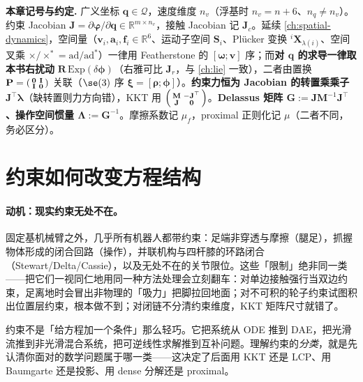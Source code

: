\begin{note}
\textbf{本章记号与约定.}\;
广义坐标 $\mathbf q\in\mathcal Q$，速度维度 $n_v$（浮基时 $n_v=n+6$、$n_q\neq n_v$）。约束 Jacobian $\mathbf J=\partial\boldsymbol\varphi/\partial\mathbf q\in\mathbb R^{m\times n_v}$，接触 Jacobian 记 $\mathbf J_c$。延续 \cref{ch:spatial-dynamics}，空间量（$\mathbf v_i,\mathbf a_i,\mathbf f_i\in\mathbb R^6$、运动子空间 $\mathbf S_i$、Plücker 变换 ${}^i\mathbf X_{\lambda(i)}$、空间叉乘 $\times/\times^*=\mathrm{ad}/\mathrm{ad}^*$）一律用 Featherstone 的 $[\boldsymbol\omega;\mathbf v]$ 序；而\textbf{对 $\mathbf q$ 的求导一律取本书右扰动} $\mathbf R\,\mathrm{Exp}(\delta\boldsymbol\phi)$（右雅可比 $\mathbf J_r$，与 \cref{ch:lie} 一致），二者由置换 $\mathbf P=\begin{psmallmatrix}\mathbf 0&\mathbf I\\\mathbf I&\mathbf 0\end{psmallmatrix}$ 关联（$\se(3)$ 序 $\boldsymbol\xi=[\boldsymbol\rho;\boldsymbol\phi]$）。\textbf{约束力恒为 Jacobian 的转置乘乘子 $\mathbf J^\top\boldsymbol\lambda$}（缺转置则力方向错），KKT 用 $\begin{psmallmatrix}\mathbf M&-\mathbf J^\top\\\mathbf J&\mathbf 0\end{psmallmatrix}$。\textbf{Delassus 矩阵 $\mathbf G:=\mathbf J\mathbf M^{-1}\mathbf J^\top$、操作空间惯量 $\boldsymbol\Lambda:=\mathbf G^{-1}$}。摩擦系数记 $\mu_f$，proximal 正则化记 $\mu$（二者不同，务必区分）。
\end{note}

\section{约束如何改变方程结构}
\label{sec:cd-motivation}

\paragraph{动机：现实约束无处不在。}
固定基机械臂之外，几乎所有机器人都带约束：足端非穿透与摩擦（腿足），抓握物体形成的闭合回路（操作），并联机构与四杆膝的环路闭合（Stewart/Delta/Cassie），以及无处不在的关节限位。这些「限制」绝非同一类——把它们一视同仁地用同一种方法处理会立刻翻车：对单边接触强行当双边约束，足离地时会冒出非物理的「吸力」把脚拉回地面；对不可积的轮子约束试图积出位置层约束，根本做不到；对闭链不分清约束维度，KKT 矩阵尺寸就错了。

\begin{insight}[约束改变的是数学结构]
约束不是「给方程加一个条件」那么轻巧。它把系统从 ODE 推到 DAE，把光滑流推到非光滑混合系统，把可逆线性求解推到互补问题。理解约束的\emph{分类}，就是先认清你面对的数学问题属于哪一类——这决定了后面用 KKT 还是 LCP、用 Baumgarte 还是投影、用 dense 分解还是 proximal。
\end{insight}


